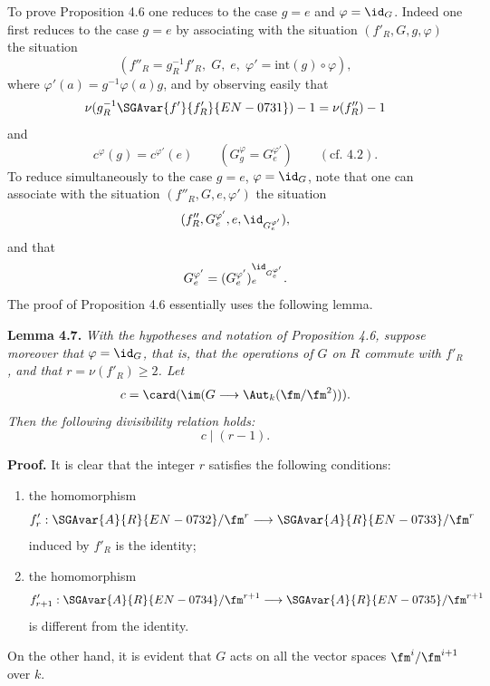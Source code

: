 \medskip
To prove Proposition 4.6 one reduces to the case $g=e$ and $\varphi=\id_G$. Indeed one first reduces to the case $g=e$ by associating with the situation $(f'_R,G,g,\varphi)$ the situation
\[
(f''_R=g_R^{-1}f'_R,
\; G,
\; e,
\; \varphi'=\mathrm{int}(g)\circ\varphi),
\]
where $\varphi'(a)=g^{-1}\varphi(a)g$, and by observing easily that
\[
\nu(g_R^{-1}\SGAvar{f'}{f'_R}{EN-0731})-1=\nu(f''_R)-1
\]
and
\[
c^\varphi(g)=c^{\varphi'}(e)\qquad (G_g^\varphi=G_e^{\varphi'})\qquad (\text{cf. 4.2}).
\]
To reduce simultaneously to the case $g=e$, $\varphi=\id_G$, note that one can associate with the situation $(f''_R,G,e,\varphi')$ the situation
\[
(f''_R,G_e^{\varphi'},e,\id_{G_e^{\varphi'}}),
\]
and that
\[
G_e^{\varphi'}=(G_e^{\varphi'})_e^{\id_{G_e^{\varphi'}}}.
\]
The proof of Proposition 4.6 essentially uses the following lemma.

\medskip
\noindent
\textbf{Lemma 4.7.} \emph{With the hypotheses and notation of Proposition 4.6, suppose moreover that $\varphi=\id_G$, that is, that the operations of $G$ on $R$ commute with $f'_R$, and that $r=\nu(f'_R)\ge2$. Let
\[
c=\card(\im(G\longrightarrow \Aut_k(\fm/\fm^2))).
\]
Then the following divisibility relation holds:
\[
c\mid (r-1).
\]}

\medskip
\noindent
\textbf{Proof.} It is clear that the integer $r$ satisfies the following conditions:
\begin{enumerate}
\item[a)] the homomorphism
\[
f'_r:\SGAvar{A}{R}{EN-0732}/\fm^r\longrightarrow \SGAvar{A}{R}{EN-0733}/\fm^r
\]
induced by $f'_R$ is the identity;
\item[b)] the homomorphism
\[
f'_{r+1}:\SGAvar{A}{R}{EN-0734}/\fm^{r+1}\longrightarrow \SGAvar{A}{R}{EN-0735}/\fm^{r+1}
\]
is different from the identity.
\end{enumerate}
On the other hand, it is evident that $G$ acts on all the vector spaces $\fm^i/\fm^{i+1}$ over $k$.

